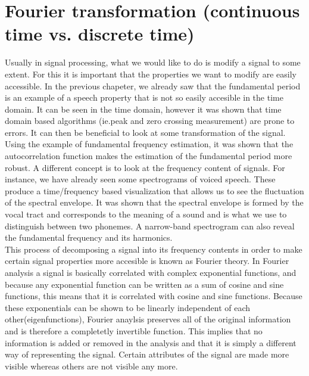\clearpage
\section{Fourier transformation (continuous time vs. discrete time)}
\label{Fourier transformation (continuous time vs. discrete time)}



Usually in signal processing, what we would like to do is modify a signal to some extent. For this it is important that the properties we want to modify are easily accessible. In the previous chapeter, we already saw that the fundamental period is an example of a speech property that is not so easily accesible in the time domain. It can be seen in the time domain, however it was shown that time domain based algorithms (ie.peak and zero crossing measurement) are prone to errors. It can then be beneficial to look at some transformation of the signal. Using the example of fundamental frequency estimation, it was shown that the autocorrelation function makes the estimation of the fundamental period more robust. A different concept is to look at the frequency content of signals. For instance, we have already seen some spectrograms of voiced speech. These produce a time/frequency based visualization that allows us to see the fluctuation of the spectral envelope.  It was shown that the spectral envelope is formed by the vocal tract and corresponds to the meaning of a sound and is what we use to distinguish between two phonemes. A narrow-band spectrogram can also reveal the fundamental frequency and its harmonics.  \\

This process of decomposing a signal into its frequency contents in order to make certain signal properties more accesible is known as Fourier theory. In Fourier analysis a signal is basically correlated with complex exponential functions, and because any exponential function can be written as a sum of cosine and sine functions, this means that it is correlated with cosine and sine functions. Because these exponentials can be shown to be linearly independent of each other(eigenfunctions), Fourier anaylsis preserves all of the original information and is therefore a completetly invertible function. This implies that no information is added or removed in the analysis and that it is simply a different way of representing the signal.  Certain attributes of the signal are made more visible whereas others are not visible any more. \\

